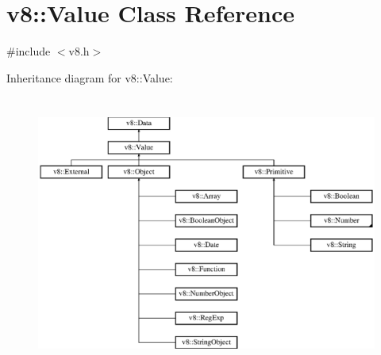 \hypertarget{classv8_1_1_value}{}\section{v8\+:\+:Value Class Reference}
\label{classv8_1_1_value}


{\ttfamily \#include $<$v8.\+h$>$}

Inheritance diagram for v8\+:\+:Value\+:\begin{figure}[H]
\begin{center}
\leavevmode
\includegraphics[height=9.105691cm]{classv8_1_1_value}
\end{center}
\end{figure}
